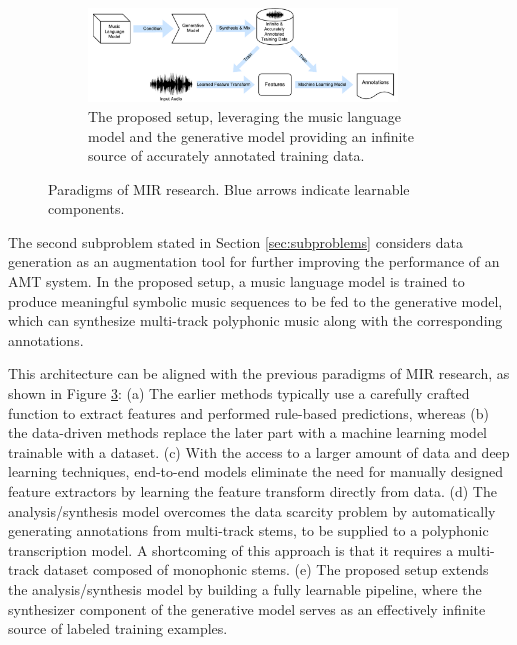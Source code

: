\begin{figure}
\begin{subfigure}[b]{\textwidth}
		\label{}
	\end{subfigure}
	\begin{subfigure}[b]{\textwidth}
		\centering
		\vspace{1em}
		\includegraphics[width=0.9\textwidth]{paradigms-5-proposed.pdf}
		\caption{The proposed setup, leveraging the music language model and the generative model providing an infinite source of accurately annotated training data.}
		\label{}
	\end{subfigure}
	\caption{Paradigms of MIR research. Blue arrows indicate learnable components.}
	\label{fig:paradigms}
\end{figure}


The second subproblem stated in Section \ref{sec:subproblems} considers data generation as an augmentation tool for further improving the performance of an AMT system.
In the proposed setup, a music language model is trained to produce meaningful symbolic music sequences to be fed to the generative model, which can synthesize multi-track polyphonic music along with the corresponding annotations.

This architecture can be aligned with the previous paradigms of MIR research, as shown in Figure \ref{fig:paradigms}:
(a) The earlier methods typically use a carefully crafted function to extract features and performed rule-based predictions, whereas (b) the data-driven methods replace the later part with a machine learning model trainable with a dataset.
(c) With the access to a larger amount of data and deep learning techniques, end-to-end models eliminate the need for manually designed feature extractors by learning the feature transform directly from data.
(d) The analysis/synthesis model \cite{salamon2017analysis} overcomes the data scarcity problem by automatically generating annotations from multi-track stems, to be supplied to a polyphonic transcription model.
A shortcoming of this approach is that it requires a multi-track dataset composed of monophonic stems.
(e) The proposed setup extends the analysis/synthesis model by building a fully learnable pipeline, where the synthesizer component of the generative model serves as an effectively infinite source of labeled training examples.

